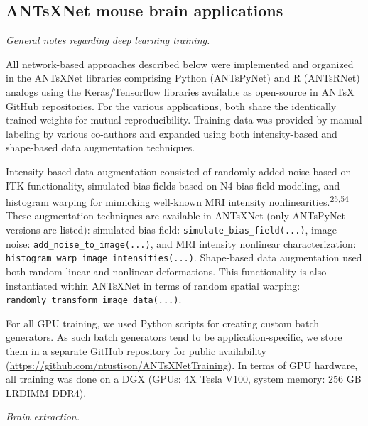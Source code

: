 \documentclass[
  12pt,
]{article}
\begin{document}
\hypertarget{antsxnet-mouse-brain-applications}{%
\subsection*{ANTsXNet mouse brain
applications}\label{antsxnet-mouse-brain-applications}}

\emph{General notes regarding deep learning training.}

All network-based approaches described below were implemented and
organized in the ANTsXNet libraries comprising Python (ANTsPyNet) and R
(ANTsRNet) analogs using the Keras/Tensorflow libraries available as
open-source in ANTsX GitHub repositories. For the various applications,
both share the identically trained weights for mutual reproducibility.
Training data was provided by manual labeling by various co-authors and
expanded using both intensity-based and shape-based data augmentation
techniques.

Intensity-based data augmentation consisted of randomly added noise
based on ITK functionality, simulated bias fields based on N4 bias field
modeling, and histogram warping for mimicking well-known MRI intensity
nonlinearities.\textsuperscript{25,54} These augmentation techniques are
available in ANTsXNet (only ANTsPyNet versions are listed): simulated
bias field: \texttt{simulate\_bias\_field(...)}, image noise:
\texttt{add\_noise\_to\_image(...)}, and MRI intensity nonlinear
characterization: \texttt{histogram\_warp\_image\_intensities(...)}.
Shape-based data augmentation used both random linear and nonlinear
deformations. This functionality is also instantiated within ANTsXNet in
terms of random spatial warping:
\texttt{randomly\_transform\_image\_data(...)}.

For all GPU training, we used Python scripts for creating custom batch
generators. As such batch generators tend to be application-specific, we
store them in a separate GitHub repository for public availability
(\url{https://github.com/ntustison/ANTsXNetTraining}). In terms of GPU
hardware, all training was done on a DGX (GPUs: 4X Tesla V100, system
memory: 256 GB LRDIMM DDR4).

\emph{Brain extraction.}
\end{document}
